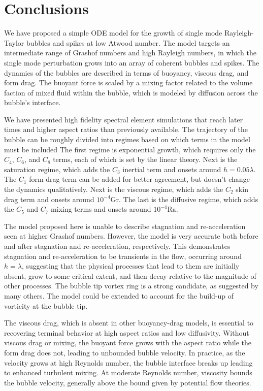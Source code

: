 \section{Conclusions} 

We have proposed a simple ODE model for the growth of single mode Rayleigh-Taylor bubbles and spikes at low Atwood number.
The model targets an intermediate range of Grashof numbers and high Rayleigh numbers, in which the single mode perturbation grows into an array of coherent bubbles and spikes.
The dynamics of the bubbles are described in terms of buoyancy, viscous drag, and form drag.
The buoyant force is scaled by a mixing factor related to the volume faction of mixed fluid within the bubble, which is modeled by diffusion across the bubble's interface.

We have presented high fidelity spectral element simulations that reach later times and higher aspect ratios than previously available.
The trajectory of the bubble can be roughly divided into regimes based on which terms in the model must be included
The first regime is exponential growth, which requires only the $C_4$, $C_6$, and $C_8$ terms, each of which is set by the linear theory.
Next is the saturation regime, which adds the $C_3$ inertial term and onsets around $h = 0.05 \lambda$.
The $C_1$ form drag term can be added for better agreement, but doesn't change the dynamics qualitatively.
Next is the viscous regime, which adds the $C_2$ skin drag term and onsets around $10^{-4} \text{Gr}$.
The last is the diffusive regime, which adds the $C_5$ and $C_7$ mixing terms and onsets around $10^{-4} \text{Ra}$.

The model proposed here is unable to describe stagnation and re-acceleration seen at higher Grashof numbers.
However, the model is very accurate both before and after stagnation and re-acceleration, respectively.
This demonstrates stagnation and re-acceleration to be transients in the flow, occurring around $h = \lambda$, suggesting that the physical processes that lead to them are initially absent, grow to some critical extent, and then decay relative to the magnitude of other processes.
The bubble tip vortex ring is a strong candidate, as suggested by many others.
The model could be extended to account for the build-up of vorticity at the bubble tip.

The viscous drag, which is absent in other buoyancy-drag models, is essential to recovering terminal behavior at high aspect ratios and low diffusivity.  
Without viscous drag or mixing, the buoyant force grows with the aspect ratio while the form drag does not, leading to unbounded bubble velocity.
In practice, as the velocity grows at high Reynolds number, the bubble interface breaks up leading to enhanced turbulent mixing.
At moderate Reynolds number, viscosity bounds the bubble velocity, generally above the bound given by potential flow theories.

